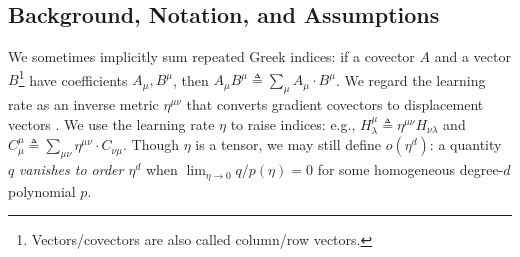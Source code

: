 \documentclass{article}
\theoremstyle{plain}
\theoremstyle{definition}
\begin{document}

\subsection{Background, Notation, and Assumptions} \label{sect:background}
       

        We sometimes implicitly sum repeated Greek indices: if a covector $A$
        and a vector $B$\footnote{
            Vectors/covectors are also called column/row vectors.
        } have coefficients $A_\mu, B^\mu$, then 
        $
            A_\mu B^\mu
            \triangleq
            \sum_\mu A_\mu \cdot B^\mu
        $.
        We regard the learning rate as an
        inverse metric $\eta^{\mu\nu}$ that converts gradient covectors to
        displacement vectors \citep{bo13}.  We use the learning rate
        $\eta$ to raise indices: e.g.,
        $
            H^{\mu}_{\lambda}
            \triangleq
            \eta^{\mu\nu} H_{\nu\lambda}
        $ and
        $
            C^{\mu}_{\mu}
            \triangleq
            \sum_{\mu \nu} \eta^{\mu\nu} \cdot C_{\nu\mu}
        $.
        Though $\eta$ is a tensor, we may still define $o(\eta^d)$: a quantity
        $q$ \emph{vanishes to order $\eta^d$} when $\lim_{\eta\to 0} q/p(\eta)
        = 0$ for some homogeneous degree-$d$ polynomial $p$.



\end{document}
